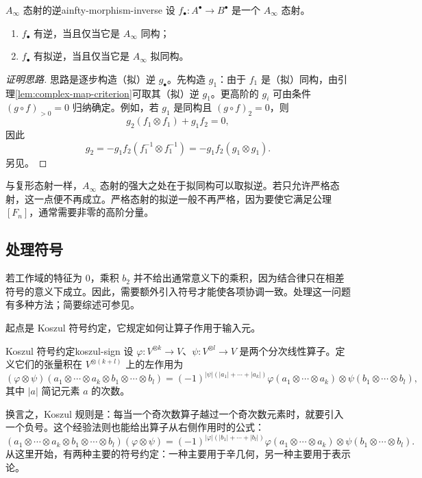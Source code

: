 \begin{lemma}{$A_\infty$ 态射的逆}{ainfty-morphism-inverse}
设 $f_\bullet\colon A^\bullet\to B^\bullet$ 是一个 $A_\infty$ 态射。
\begin{enumerate}
  \item $f_\bullet$ 有逆，当且仅当它是 $A_\infty$ 同构；
  \item $f_\bullet$ 有拟逆，当且仅当它是 $A_\infty$ 拟同构。
\end{enumerate}
\end{lemma}
\begin{proof}[证明思路]
思路是逐步构造（拟）逆 $g_\bullet$。先构造 $g_1$：由于 $f_1$ 是（拟）同构，由引理\ref{lem:complex-map-criterion}可取其（拟）逆 $g_1$。更高阶的 $g_i$ 可由条件 $(g\circ f)_{>0}=0$ 归纳确定。例如，若 $g_1$ 是同构且 $(g\circ f)_2=0$，则
\[
  g_2(f_1\otimes f_1)+g_1f_2=0,
\]
因此
\[
  g_2=-g_1f_2(f_1^{-1}\otimes f_1^{-1})
      =-g_1f_2(g_1\otimes g_1).
\]
另见。
\end{proof}

与复形态射一样，$A_\infty$ 态射的强大之处在于拟同构可以取拟逆。若只允许严格态射，这一点便不再成立。严格态射的拟逆一般不再严格，因为要使它满足公理 $[F_n]$，通常需要非零的高阶分量。

\subsection{处理符号}\label{subsec:sign-conventions}
若工作域的特征为 $0$，乘积 $b_2$ 并不给出通常意义下的乘积，因为结合律只在相差符号的意义下成立。因此，需要额外引入符号才能使各项协调一致。处理这一问题有多种方法；简要综述可参见。

起点是 Koszul 符号约定，它规定如何让算子作用于输入元。

\begin{definition}{Koszul 符号约定}{koszul-sign}
设 $\varphi\colon V^{\otimes k}\to V$、$\psi\colon V^{\otimes l}\to V$ 是两个分次线性算子。定义它们的张量积在 $V^{\otimes(k+l)}$ 上的左作用为
\[
  (\varphi\otimes\psi)
  (a_1\otimes\cdots\otimes a_k\otimes b_1\otimes\cdots\otimes b_l)
  =
  (-1)^{|\psi|(|a_1|+\cdots+|a_k|)}
  \varphi(a_1\otimes\cdots\otimes a_k)
  \otimes
  \psi(b_1\otimes\cdots\otimes b_l),
\]
其中 $|a|$ 简记元素 $a$ 的次数。
\end{definition}
换言之，Koszul 规则是：每当一个奇次数算子越过一个奇次数元素时，就要引入一个负号。这个经验法则也能给出算子从右侧作用时的公式：
\[
  (a_1\otimes\cdots\otimes a_k\otimes b_1\otimes\cdots\otimes b_l)
  (\varphi\otimes\psi)
  =
  (-1)^{|\varphi|(|b_1|+\cdots+|b_l|)}
  \varphi(a_1\otimes\cdots\otimes a_k)
  \otimes\psi(b_1\otimes\cdots\otimes b_l).
\]
从这里开始，有两种主要的符号约定：一种主要用于辛几何，另一种主要用于表示论。

